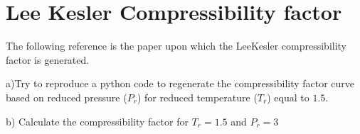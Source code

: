 \documentclass[letterpaper,10pt,english]{jupyterBook}
\begin{document}
\section{Lee \sphinxhyphen{} Kesler Compressibility factor}
\label{\detokenize{notebooks/Chapter3/CH3-Q5_v1:lee-kesler-compressibility-factor}}\label{\detokenize{notebooks/Chapter3/CH3-Q5_v1::doc}}
\sphinxAtStartPar
The following reference is the paper upon which the Lee\sphinxhyphen{}Kesler compressibility factor is generated.

\sphinxAtStartPar
{}

\sphinxAtStartPar
a)Try to reproduce a python code to regenerate the compressibility factor curve based on reduced pressure (\(P_r\)) for reduced temperature (\(T_r\)) equal to \(1.5\).

\sphinxAtStartPar
b) Calculate the compressibility factor for \(T_r = 1.5\) and \(P_r = 3\)
\end{document}
